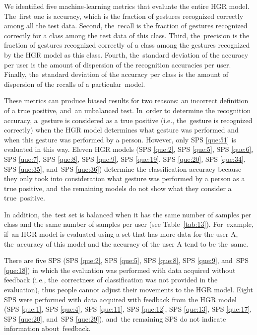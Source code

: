 \documentclass[sensors,review,accept,moreauthors,pdftex]{Definitions/mdpi}
\begin{document}
We identified five machine-learning metrics that evaluate the entire HGR model. The~first one is accuracy, which is the fraction of gestures recognized correctly among all the test data. Second, the~recall is the fraction of gestures recognized correctly for a class among the test data of this class. Third, the~precision is the fraction of gestures recognized correctly of a class among the gestures recognized by the HGR model as this class. Fourth, the~standard deviation of the accuracy per user is the amount of dispersion of the recognition accuracies per user. Finally, the~standard deviation of the accuracy per class is the amount of dispersion of the recalls of a particular~model.

These metrics can produce biased results for two reasons: an incorrect definition of a true positive, and~an unbalanced test. In~order to determine the recognition accuracy, a~gesture is considered as a true positive (i.e., the~gesture is recognized correctly) when the HGR model determines what gesture was performed and when this gesture was performed by a person. However, only SPS \ref{que:51} is evaluated in this way. Eleven HGR models (SPS \ref{que:2}, SPS \ref{que:5}, SPS \ref{que:6}, SPS \ref{que:7}, SPS \ref{que:8}, SPS \ref{que:9}, SPS \ref{que:19}, SPS \ref{que:20}, SPS \ref{que:34}, SPS \ref{que:35}, and~SPS \ref{que:36}) determine the classification accuracy because they only took into consideration what gesture was performed by a person as a true positive, and~the remaining models do not show what they consider a true~positive.





	


In addition, the~test set is balanced when it has the same number of samples per class and the same number of samples per user (see Table~\ref{tab:13}). For~example, if~an HGR model is evaluated using a set that has more data for the user A, the~accuracy of this model and the accuracy of the user A tend to be the~same. 

 

There are five SPS (SPS \ref{que:2}, SPS \ref{que:5}, SPS \ref{que:8}, SPS \ref{que:9}, and~SPS \ref{que:18}) in which the evaluation was performed with data acquired without feedback (i.e., the~correctness of classification was not provided in the evaluation), thus people cannot adjust their movements to the HGR model. Eight SPS were performed with data acquired with feedback from the HGR model (SPS \ref{que:1}, SPS \ref{que:4}, SPS \ref{que:11}, SPS \ref{que:12}, SPS \ref{que:13}, SPS \ref{que:17}, SPS \ref{que:20}, and~SPS \ref{que:29}), and~the remaining SPS do not indicate information about~feedback.
\end{document}
